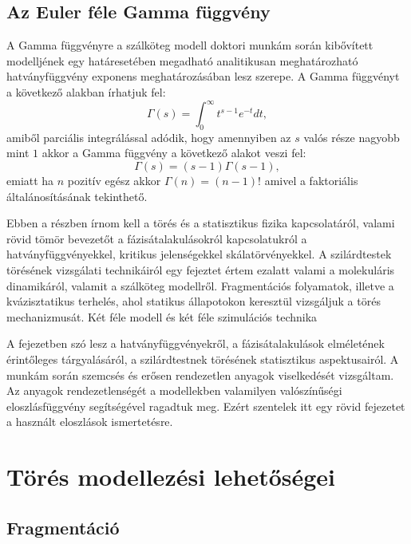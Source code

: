 \subsection{Az Euler féle Gamma függvény}
\cite{distribution_stat2000}
	A Gamma függvényre a szálköteg modell doktori munkám során kibővített modelljének egy határesetében megadható analitikusan meghatározható hatványfüggvény exponens meghatározásában lesz szerepe. A Gamma függvényt a következő alakban írhatjuk fel:	
	\begin{equation}
		\Gamma\left(s\right)=\int_0^{\infty} \! t^{s-1}e^{-t} dt,
	\end{equation}
amiből parciális integrálással adódik, hogy amennyiben az $s$ valós része nagyobb mint $1$ akkor a Gamma függvény a következő alakot veszi fel:
	\begin{equation}
		\Gamma(s)=(s-1)\Gamma(s-1),
	\end{equation}
emiatt ha $n$ pozitív egész akkor $\Gamma(n)=(n-1)!$ amivel a faktoriális általánosításának tekinthető.


	Ebben a részben írnom kell a törés és a statisztikus fizika kapcsolatáról, valami rövid tömör bevezetőt a fázisátalakulásokról kapcsolatukról a hatványfüggvényekkel, kritikus jelenségekkel skálatörvényekkel. 
	A szilárdtestek törésének vizsgálati technikáiról egy fejeztet értem ezalatt valami a molekuláris dinamikáról, valamit a szálköteg modellről. Fragmentációs folyamatok, illetve a kvázisztatikus terhelés, ahol statikus állapotokon keresztül vizsgáljuk a törés mechanizmusát. Két féle modell és két féle szimulációs technika

A fejezetben szó lesz a hatványfüggvényekről, a fázisátalakulások elméletének érintőleges tárgyalásáról, a szilárdtestnek törésének statisztikus aspektusairól.
A munkám során szemcsés és erősen rendezetlen anyagok viselkedését vizsgáltam. Az anyagok rendezetlenségét a modellekben valamilyen valószínűségi eloszlásfüggvény segítségével ragadtuk meg. Ezért szentelek itt egy rövid fejezetet a használt eloszlások ismertetésre. 

\section{Törés modellezési lehetőségei}

\subsection{Fragmentáció}

